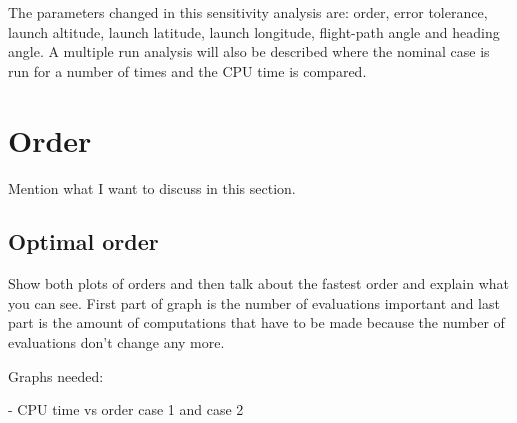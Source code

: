The parameters changed in this sensitivity analysis are: order, error tolerance, launch altitude, launch latitude, launch longitude, flight-path angle and heading angle. A multiple run analysis will also be described where the nominal case is run for a number of times and the CPU time is compared. 


\section{Order}
\label{sec:order}
Mention what I want to discuss in this section.

\subsection{Optimal order}
\label{subsec:optimalOrder}
Show both plots of orders and then talk about the fastest order and explain what you can see. First part of graph is the number of evaluations important and last part is the amount of computations that have to be made because the number of evaluations don't change any more.

Graphs needed:

- CPU time vs order case 1 and case 2


%

